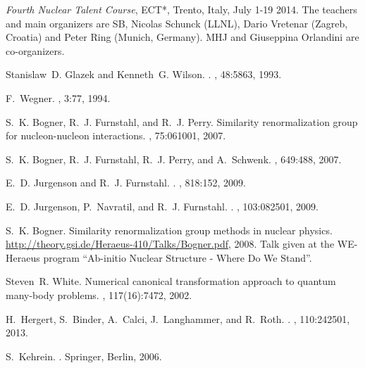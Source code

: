 \begin{thebibliography}{200}
 {\em Fourth Nuclear Talent Course}, ECT*, Trento, Italy, July 1-19 2014. The teachers and main organizers are SB, Nicolas Schunck (LLNL), Dario Vretenar (Zagreb, Croatia) and Peter Ring (Munich, Germany).  MHJ and Giuseppina Orlandini are co-organizers. 




Stanislaw~D. Glazek and Kenneth~G. Wilson.
.
, 48:5863, 1993.

F.~Wegner.
, 3:77, 1994.

S.~K. Bogner, R.~J. Furnstahl, and R.~J. Perry.
\newblock Similarity renormalization group for nucleon-nucleon interactions.
, 75:061001, 2007.

S.~K. Bogner, R.~J. Furnstahl, R.~J. Perry, and A.~Schwenk.
, 649:488, 2007.


E.~D. Jurgenson and R.~J. Furnstahl.
.
, 818:152, 2009.

E.~D. Jurgenson, P.~Navratil, and R.~J. Furnstahl.
.
, 103:082501, 2009.


S.~K. Bogner.
\newblock Similarity renormalization group methods in nuclear physics.
\newblock \url{http://theory.gsi.de/Heraeus-410/Talks/Bogner.pdf}, 2008.
\newblock Talk given at the WE-Heraeus program ``Ab-initio Nuclear Structure -
  Where Do We Stand''.

Steven~R. White.
\newblock Numerical canonical transformation approach to quantum many-body
  problems.
, 117(16):7472, 2002.



H.~Hergert, S.~Binder, A.~Calci, J.~Langhammer, and R.~Roth.
.
, 110:242501, 2013.

S.~Kehrein.
.
\newblock Springer, Berlin, 2006.


\end{thebibliography}
